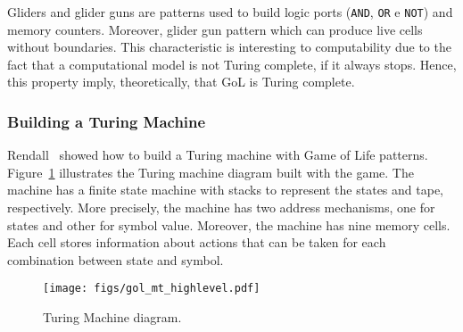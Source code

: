 \documentclass[12pt]{article}
\begin{document}
Gliders and glider guns are patterns used to build logic ports (\texttt{AND}, \texttt{OR} e \texttt{NOT}) and memory counters. Moreover, glider gun pattern which can produce live cells without boundaries. This characteristic is interesting to computability due to the fact that a computational model is not Turing complete, if it always stops. Hence, this property imply, theoretically, that GoL is Turing complete.


\subsubsection{Building a Turing Machine}

Rendall~\cite{rendall} showed how to build a Turing machine with Game of Life patterns. Figure~\ref{fig:gol_mt_highlevel} illustrates the Turing machine diagram built with the game. The machine has a finite state machine with stacks to represent the states and tape, respectively. More precisely, the machine has two address mechanisms, one for states and other for symbol value. Moreover, the machine has nine memory cells. Each cell stores information about actions that can be taken for each combination between state and symbol.


\begin{figure}[h]
    \centering
    \texttt{[image: figs/gol\_mt\_highlevel.pdf]}
    \caption{Turing Machine diagram.}
    \label{fig:gol_mt_highlevel}
\end{figure}
\end{document}
